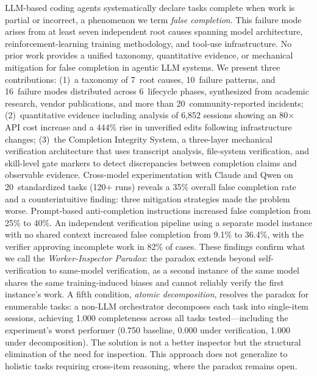 LLM-based coding agents systematically declare tasks complete when work is
partial or incorrect, a phenomenon we term \emph{false completion}.
This failure mode arises from at least seven independent root causes spanning
model architecture, reinforcement-learning training methodology, and
tool-use infrastructure.
No prior work provides a unified taxonomy, quantitative evidence, or
mechanical mitigation for false completion in agentic LLM systems.
We present three contributions:
(1)~a taxonomy of 7~root causes, 10~failure patterns, and 16~failure modes
distributed across 6~lifecycle phases, synthesized from academic research,
vendor publications, and more than 20~community-reported incidents;
(2)~quantitative evidence including analysis of 6{,}852 sessions showing an
80$\times$ API cost increase and a 444\% rise in unverified edits following
infrastructure changes;
(3)~the Completion Integrity System, a three-layer mechanical verification
architecture that uses transcript analysis, file-system verification, and
skill-level gate markers to detect discrepancies between completion claims
and observable evidence.
Cross-model experimentation with Claude and Qwen on 20~standardized
tasks (120+ runs) reveals a 35\% overall false completion rate and a
counterintuitive finding: three mitigation strategies made the problem
worse.
Prompt-based anti-completion instructions increased false completion from
25\% to 40\%. An independent verification pipeline using a separate model
instance with no shared context increased false completion from 9.1\% to
36.4\%, with the verifier approving incomplete work in 82\% of cases.
These findings confirm what we call the \emph{Worker-Inspector Paradox}:
the paradox extends beyond self-verification to same-model verification,
as a second instance of the same model shares the same training-induced
biases and cannot reliably verify the first instance's work.
A fifth condition, \emph{atomic decomposition}, resolves the paradox for
enumerable tasks: a non-LLM orchestrator decomposes each task into
single-item sessions, achieving 1.000 completeness across all tasks
tested---including the experiment's worst performer (0.750 baseline,
0.000 under verification, 1.000 under decomposition).
The solution is not a better inspector but the structural elimination of
the need for inspection.
This approach does not generalize to holistic tasks requiring cross-item
reasoning, where the paradox remains open.
